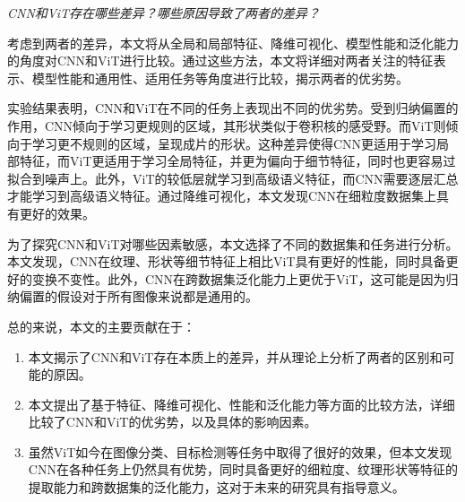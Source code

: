 \textit{CNN和ViT存在哪些差异？哪些原因导致了两者的差异？}

考虑到两者的差异，本文将从全局和局部特征、降维可视化、模型性能和泛化能力的角度对CNN和ViT进行比较。通过这些方法，本文将详细对两者关注的特征表示、模型性能和通用性、适用任务等角度进行比较，揭示两者的优劣势。

实验结果表明，CNN和ViT在不同的任务上表现出不同的优劣势。受到归纳偏置的作用，CNN倾向于学习更规则的区域，其形状类似于卷积核的感受野。而ViT则倾向于学习更不规则的区域，呈现成片的形状。这种差异使得CNN更适用于学习局部特征，而ViT更适用于学习全局特征，并更为偏向于细节特征，同时也更容易过拟合到噪声上。此外，ViT的较低层就学习到高级语义特征，而CNN需要逐层汇总才能学习到高级语义特征。通过降维可视化，本文发现CNN在细粒度数据集上具有更好的效果。

为了探究CNN和ViT对哪些因素敏感，本文选择了不同的数据集和任务进行分析。本文发现，CNN在纹理、形状等细节特征上相比ViT具有更好的性能，同时具备更好的变换不变性。此外，CNN在跨数据集泛化能力上更优于ViT，这可能是因为归纳偏置的假设对于所有图像来说都是通用的。

总的来说，本文的主要贡献在于：

\begin{enumerate}
  \item 本文揭示了CNN和ViT存在本质上的差异，并从理论上分析了两者的区别和可能的原因。
  \item 本文提出了基于特征、降维可视化、性能和泛化能力等方面的比较方法，详细比较了CNN和ViT的优劣势，以及具体的影响因素。
  \item 虽然ViT如今在图像分类、目标检测等任务中取得了很好的效果，但本文发现CNN在各种任务上仍然具有优势，同时具备更好的细粒度、纹理形状等特征的提取能力和跨数据集的泛化能力，这对于未来的研究具有指导意义。
\end{enumerate}